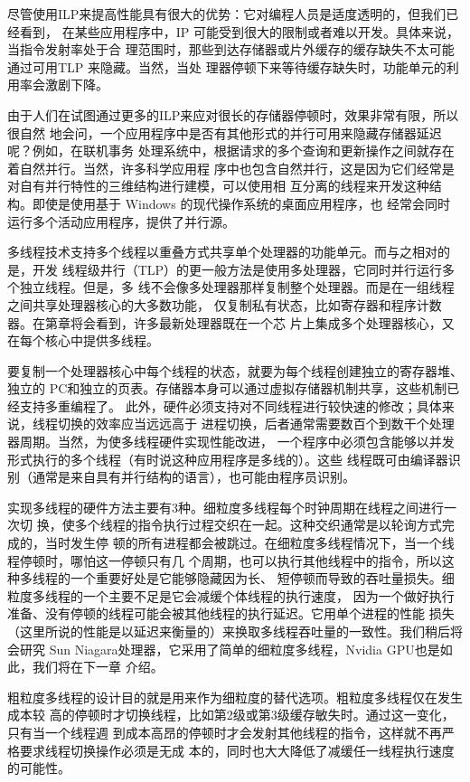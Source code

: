 尽管使用ILP来提高性能具有很大的优势：它对编程人员是适度透明的，但我们已经看到，
在某些应用程序中，IP 可能受到很大的限制或者难以开发。具体来说，当指令发射率处于合
理范围时，那些到达存储器或片外缓存的缓存缺失不太可能通过可用TLP 来隐藏。当然，当处
理器停顿下来等待缓存缺失时，功能单元的利用率会激剧下降。

由于人们在试图通过更多的ILP来应对很长的存储器停顿时，效果非常有限，所以很自然
地会问，一个应用程序中是否有其他形式的并行可用来隐藏存储器延迟呢？例如，在联机事务
处理系统中，根据请求的多个查询和更新操作之间就存在着自然并行。当然，许多科学应用程
序中也包含自然并行，这是因为它们经常是对自有并行特性的三维结构进行建模，可以使用相
互分离的线程来开发这种结构。即使是使用基于 Windows 的现代操作系统的桌面应用程序，也
经常会同时运行多个活动应用程序，提供了并行源。

多线程技术支持多个线程以重叠方式共享单个处理器的功能单元。而与之相对的是，开发
线程级井行（TLP）的更一般方法是使用多处理器，它同时并行运行多个独立线程。但是，多
线不会像多处理器那样复制整个处理器。而是在一组线程之间共享处理器核心的大多数功能，
仅复制私有状态，比如寄存器和程序计数器。在第章将会看到，许多最新处理器既在一个芯
片上集成多个处理器核心，又在每个核心中提供多线程。

要复制一个处理器核心中每个线程的状态，就要为每个线程创建独立的寄存器堆、独立的
PC和独立的页表。存储器本身可以通过虚拟存储器机制共享，这些机制已经支持多重编程了。
此外，硬件必须支持对不同线程进行较快速的修改；具体来说，线程切换的效率应当远远高于
进程切换，后者通常需要数百个到数干个处理器周期。当然，为使多线程硬件实现性能改进，
一个程序中必须包含能够以并发形式执行的多个线程（有时说这种应用程序是多线的）。这些
线程既可由编译器识别（通常是来自具有并行结构的语言），也可能由程序员识别。

实现多线程的硬件方法主要有3种。细粒度多线程每个时钟周期在线程之间进行一次切
换，使多个线程的指令执行过程交织在一起。这种交织通常是以轮询方式完成的，当时发生停
顿的所有进程都会被跳过。在细粒度多线程情况下，当一个线程停顿时，哪怕这一停顿只有几
个周期，也可以执行其他线程中的指令，所以这种多线程的一个重要好处是它能够隐藏因为长、
短停顿而导致的吞吐量损失。细粒度多线程的一个主要不足是它会减缓个体线程的执行速度，
因为一个做好执行准备、没有停顿的线程可能会被其他线程的执行延迟。它用单个进程的性能
损失（这里所说的性能是以延迟来衡量的）来换取多线程吞吐量的一致性。我们稍后将会研究
Sun Niagara处理器，它采用了简单的细粒度多线程，Nvidia GPU也是如此，我们将在下一章
介绍。

粗粒度多线程的设计目的就是用来作为细粒度的替代选项。粗粒度多线程仅在发生成本较
高的停顿时才切换线程，比如第2级或第3级缓存敏失时。通过这一变化，只有当一个线程週
到成本高昂的停顿时才会发射其他线程的指令，这样就不再严格要求线程切换操作必须是无成
本的，同时也大大降低了减缓任一线程执行速度的可能性。

